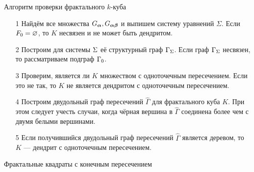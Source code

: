 \documentclass[aspectratio=1610, 10pt, notheorems]{beamer}
\begin{document}
\begin{frame}
\end{frame}


\begin{frame}{Алгоритм проверки фрактального $k$-куба}


\begin{itemize}

\item[1] Найдём все множества $G_{\bm{\alpha}}, G_{{\bm{\alpha}}{\bm{\beta}}}$ и выпишем систему уравнений $\Sigma$.
Если $F_0=\varnothing$, то $K$ несвязен и не может быть дендритом.

\item[2] Построим для системы $\Sigma$ её структурный граф $\Gamma_\Sigma$.
Если граф $\Gamma_\Sigma$ несвязен, то рассматриваем подграф $\Gamma_0$.
 
\item[3] Проверим, является ли $K$ множеством с одноточечным пересечением.
Если это не так, то $K$ не является дендритом с одноточечным пересечением.
    
\item[4] Построим двудольный граф пересечений $\hat\Gamma$ для фрактального куба $K$.
При этом следует учесть случаи, когда чёрная вершина в $\hat\Gamma$ соединена более чем с двумя белыми вершинами.

\item[5] Если получившийся двудольный граф пересечений $\hat\Gamma$ является деревом, то $K$ --- дендрит с одноточечным пересечением.    
\end{itemize}
\end{frame}


\begin{frame}{}
\Huge{Фрактальные квадраты с конечным пересечением}
\end{frame}
\end{document}
